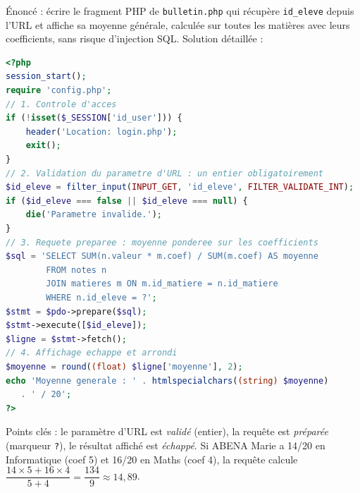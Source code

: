 \documentclass[11pt]{article}
\begin{document}
\begin{exoresolu}
Énoncé : écrire le fragment PHP de \texttt{bulletin.php} qui récupère \texttt{id\_eleve} depuis l'URL et affiche sa moyenne générale, calculée sur toutes les matières avec leurs coefficients, sans risque d'injection SQL.
\tcblower
Solution détaillée :
\begin{lstlisting}[language=Php]
<?php
session_start();
require 'config.php';
// 1. Controle d'acces
if (!isset($_SESSION['id_user'])) {
    header('Location: login.php');
    exit();
}
// 2. Validation du parametre d'URL : un entier obligatoirement
$id_eleve = filter_input(INPUT_GET, 'id_eleve', FILTER_VALIDATE_INT);
if ($id_eleve === false || $id_eleve === null) {
    die('Parametre invalide.');
}
// 3. Requete preparee : moyenne ponderee sur les coefficients
$sql = 'SELECT SUM(n.valeur * m.coef) / SUM(m.coef) AS moyenne
        FROM notes n
        JOIN matieres m ON m.id_matiere = n.id_matiere
        WHERE n.id_eleve = ?';
$stmt = $pdo->prepare($sql);
$stmt->execute([$id_eleve]);
$ligne = $stmt->fetch();
// 4. Affichage echappe et arrondi
$moyenne = round((float) $ligne['moyenne'], 2);
echo 'Moyenne generale : ' . htmlspecialchars((string) $moyenne)
   . ' / 20';
?>
\end{lstlisting}
Points clés : le paramètre d'URL est \emph{validé} (entier), la requête est \emph{préparée} (marqueur \texttt{?}), le résultat affiché est \emph{échappé}. Si ABENA Marie a 14/20 en Informatique (coef 5) et 16/20 en Maths (coef 4), la requête calcule $\dfrac{14 \times 5 + 16 \times 4}{5 + 4} = \dfrac{134}{9} \approx 14{,}89$.
\end{exoresolu}
\end{document}
